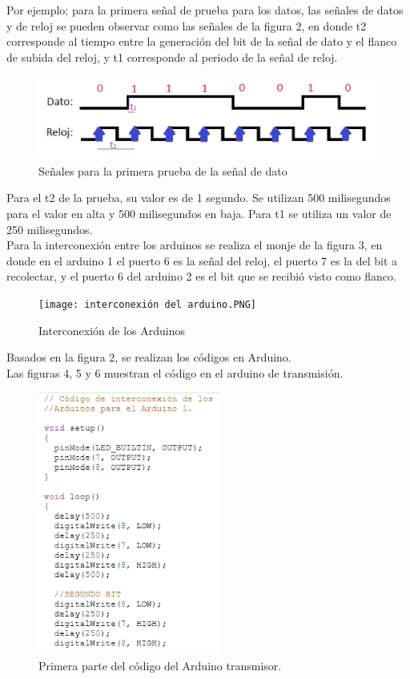 \documentclass{article}
\begin{document}
Por ejemplo; para la primera señal de prueba para los datos, las señales de datos y de reloj se pueden observar como las señales de la figura 2, en donde t2 corresponde al tiempo entre la generación del bit de la señal de dato y el flanco de subida del reloj, y t1 corresponde al periodo de la señal de reloj.\\

\begin{figure}[h]
\includegraphics[width=12cm]{Prueba_datos_y_clock.jpeg}
\centering
\caption{Señales para la primera prueba de la señal de dato}
\label{fig:Prueba_datos_y_clock.jpeg}
\end{figure}

Para el t2 de la prueba, su valor es de 1 segundo. Se utilizan 500 milisegundos para el valor en alta y 500 milisegundos en baja. Para t1 se utiliza un valor de 250 milisegundos.\\


Para la interconexión entre los arduinos se realiza el monje de la figura 3, en donde en el arduino 1 el puerto 6 es la señal del reloj, el puerto 7 es la del bit a recolectar, y el puerto 6 del arduino 2 es el bit que se recibió visto como flanco.
\newpage


\begin{figure}[h]
\texttt{[image: interconexión del arduino.PNG]}
\centering
\caption{Interconexión de los Arduinos}
\label{fig:interconexión del arduino.PNG}
\end{figure}

Basados en la figura 2, se realizan los códigos en Arduino.\\


Las figuras 4, 5 y 6 muestran el código en el arduino de transmisión.\\

\newpage

\begin{figure}[h]
\includegraphics[width=6cm]{codigo_arduino1_1.PNG}
\centering
\caption{Primera parte del código del Arduino transmisor.}
\label{fig:codigo_arduino1_1.PNG}
\end{figure}
\end{document}
